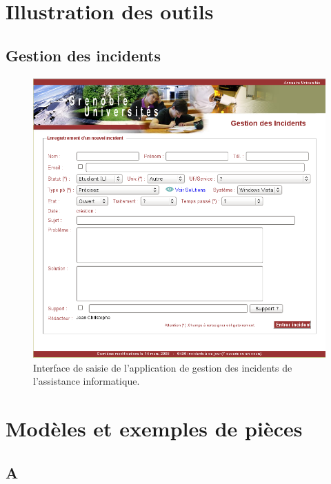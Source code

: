 \section{Illustration des outils}
\subsection{Gestion des incidents}
\label{gestion_incidents}
\begin{figure}[!h]
	\centering
	\includegraphics[width=12cm]{annexes/gestion_des_incidents.png}
	\caption{Interface de saisie de l'application de gestion des incidents de l'assistance informatique.}
\end{figure}
\clearpage
\section{Modèles et exemples de pièces}
\subsection{A}

